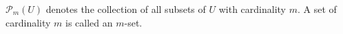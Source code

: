 $\mathcal{P}_m(U)$ denotes the collection of all subsets of $U$ with cardinality $m$. A set of cardinality $m$ is called an $m$-set.

